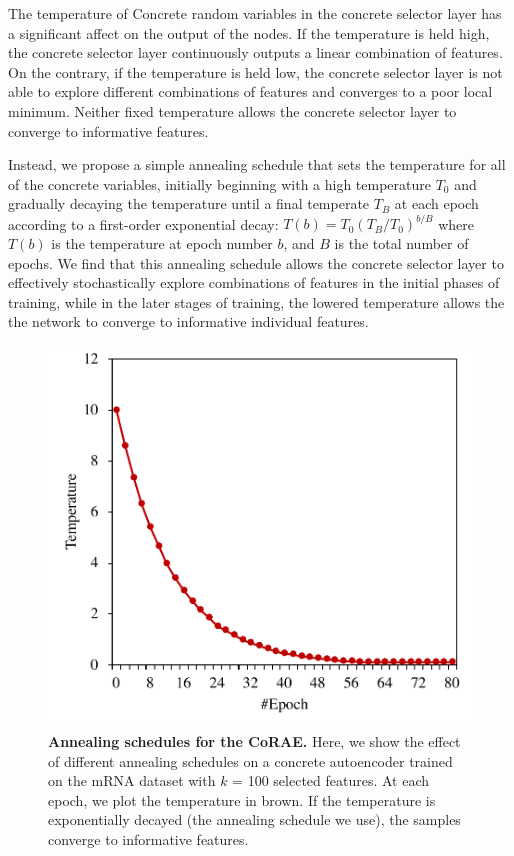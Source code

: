 \documentclass{bioinfo}
\begin{document}
The temperature of Concrete random variables in the concrete selector layer has a significant affect on the output
of the nodes. If the temperature is held high, the concrete
selector layer continuously outputs a linear combination of
features. On the contrary, if the temperature is held low, the
concrete selector layer is not able to explore different combinations of features and converges to a poor local minimum.
Neither fixed temperature allows the concrete selector layer
to converge to informative features.

Instead, we propose a simple annealing schedule that sets the temperature for all of the concrete variables, initially
beginning with a high temperature $T_0$ and gradually decaying the temperature until a final temperate $T_B$ at each
epoch according to a first-order exponential decay: $T(b) =
T_0(T_B/T_0)^{b/B}$ where $T(b)$ is the temperature at epoch number $b$, and $B$ is the total number of epochs. We find that this annealing schedule
allows the concrete selector layer to effectively stochastically explore combinations of features in the initial phases
of training, while in the later stages of training, the lowered
temperature allows the the network to converge to informative individual features.

\begin{figure}[hbt]
    \centering
    \includegraphics[scale=0.5]{fig/temp-epoch-mRNA.pdf}
    \caption{\textbf{Annealing schedules for the CoRAE.} Here, we show the effect of different annealing schedules on a
concrete autoencoder trained on the mRNA dataset with $k$ = 100
selected features. At each epoch, we plot the temperature in brown. If
the temperature is exponentially decayed (the annealing schedule
we use), the samples converge to informative features.}
    \label{fig:architecture}
\end{figure}
\end{document}
